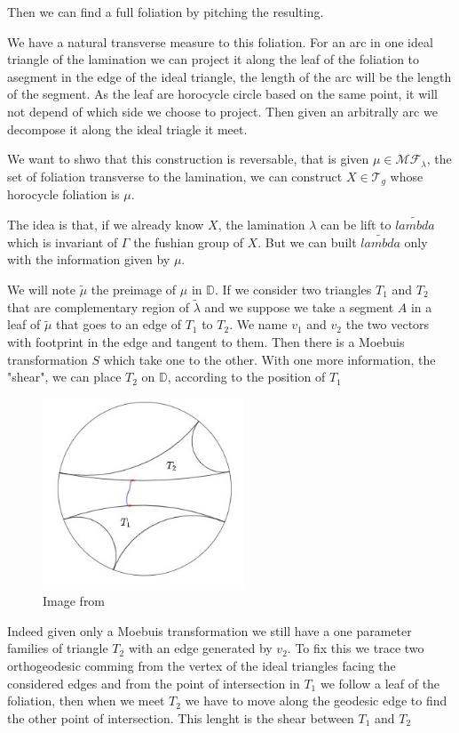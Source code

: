 Then we can find a full foliation by pitching the resulting.

We have a natural transverse measure to this foliation. For an arc in one ideal triangle of the lamination we can project it along the leaf of the foliation to asegment in the edge of the ideal triangle, the length of the arc will be the length of the segment. As the leaf are horocycle circle based on the same point, it will not depend of which side we choose to project. Then given an arbitrally arc we decompose it along the ideal triagle it meet.

We want to shwo that this construction is reversable, that is given $\mu \in \mathcal{MF}_\lambda $, the set of foliation transverse to the lamination, we can
construct $X \in \mathcal{T}_g$ whose horocycle foliation is $\mu$.

The idea is that, if we already know $X$, the lamination $\lambda$ can be lift to $\tilde{lambda}$ which is invariant of $\Gamma$ the fushian group of $X$. But we can built $\tilde{lambda}$ only with the information given by $\mu$.

We will note $\tilde{\mu}$ the preimage of $\mu$ in $\mathbb{D}$. If we consider two triangles $T_1$ and $T_2$  that are complementary region of $\tilde{\lambda}$ and we suppose we take a segment $A$ in a leaf of $\tilde{\mu}$ that goes to an edge of $T_1$ to $T_2$. We name $v_1$ and $v_2$ the two vectors with footprint in the edge and tangent to them. Then there is a Moebuis transformation $S$ which take one to the other. With one more information, the "shear", we can place $T_2$ on $\mathbb{D}$, according to the position of $T_1$

\begin{figure}[h!]
\centering
\includegraphics[width=6cm]{Image/Foliation.jpg}
\caption{Image from \cite{wright2018mirzakhani}}
\end{figure}

Indeed given only a Moebuis transformation we still have a one parameter families of triangle $T_2$ with an edge generated by $v_2$. To fix this we trace two orthogeodesic comming from the vertex of the ideal triangles facing the considered edges and from the point of intersection in $T_1$ we follow a leaf of the foliation, then when we meet $T_2$ we have to move along the geodesic edge to find the other point of intersection. This lenght is the shear between $T_1$ and $T_2$

